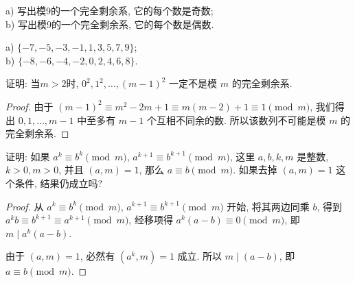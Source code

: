 \documentclass[a5paper,fleqn,10pt]{article}
\begin{document}
\begin{exmp}
	\begin{tabbing}
		\hspace{3em}a) 写出模9的一个完全剩余系, 它的每个数是奇数;\\
		\hspace{3em}b) 写出模9的一个完全剩余系, 它的每个数是偶数.
	\end{tabbing}
\end{exmp}
\begin{solution}
	\begin{tabbing}
		\hspace{2em}a) $\{-7,-5,-3,-1,1,3,5,7,9\}$;\\
		\hspace{2em}b) $\{-8,-6,-4,-2,0,2,4,6,8\}$.
	\end{tabbing}
\end{solution}

\begin{exmp}
	证明: 当$m>2$时, $0^2,1^2,\ldots,(m-1)^2$ 一定不是模 $m$ 的完全剩余系.
\end{exmp}
\begin{proof}
	由于 $(m-1)^2\equiv m^2-2m+1\equiv m(m-2)+1\equiv 1\pmod m$, 我们得出 $0,1,\ldots,m-1$ 中至多有
	$m-1$ 个互相不同余的数. 所以该数列不可能是模 $m$ 的完全剩余系.
\end{proof}

\begin{exmp}
	证明: 如果 $a^k\equiv b^k\pmod m$, $a^{k+1}\equiv b^{k+1}\pmod m$, 这里 $a,b,k,m$ 是整数, $k>0,m>0$,
	并且 $(a,m)=1$, 那么 $a\equiv b\pmod m$. 如果去掉 $(a,m)=1$ 这个条件, 结果仍成立吗?
\end{exmp}
\begin{proof}
	从 $a^k\equiv b^k\pmod m$, $a^{k+1}\equiv b^{k+1}\pmod m$ 开始, 将其两边同乘 $b$, 得到
	$a^kb\equiv b^{k+1}\equiv a^{k+1}\pmod m$, 经移项得 $a^k(a-b)\equiv 0\pmod m$, 即 $m\mid a^k(a-b)$.

	由于 $(a,m)=1$, 必然有 $(a^k,m)=1$ 成立. 所以 $m\mid (a-b)$, 即 $a\equiv b\pmod m$.
\end{proof}
\end{document}

